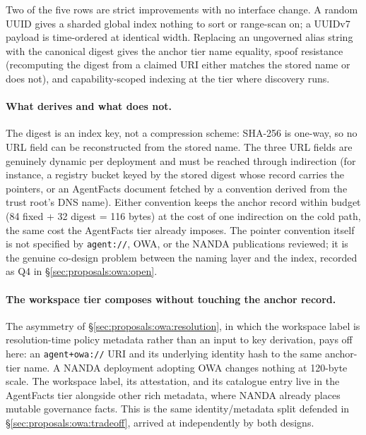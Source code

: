 Two of the five rows are strict improvements with no
interface change. A random UUID gives a sharded global
index nothing to sort or range-scan on; a UUIDv7 payload
is time-ordered at identical width. Replacing an
ungoverned alias string with the canonical digest gives
the anchor tier name equality, spoof resistance
(recomputing the digest from a claimed URI either matches
the stored name or does not), and capability-scoped
indexing at the tier where discovery runs.

\paragraph{What derives and what does not.}
The digest is an index key, not a compression scheme:
SHA-256 is one-way, so no URL field can be reconstructed
from the stored name. The three URL fields are genuinely
dynamic per deployment and must be reached through
indirection (for instance, a registry bucket keyed by the
stored digest whose record carries the pointers, or an
AgentFacts document fetched by a convention derived from
the trust root's DNS name). Either convention keeps the
anchor record within budget (84 fixed + 32 digest = 116
bytes) at the cost of one indirection on the cold path,
the same cost the AgentFacts tier already imposes. The
pointer convention itself is not specified by
\texttt{agent://}, OWA, or the NANDA publications
reviewed; it is the genuine co-design problem between the
naming layer and the index, recorded as Q4 in
\S\ref{sec:proposals:owa:open}.

\paragraph{The workspace tier composes without touching the anchor record.}
The asymmetry of \S\ref{sec:proposals:owa:resolution},
in which the workspace label is resolution-time policy
metadata rather than an input to key derivation, pays off
here: an \texttt{agent+owa://} URI and its underlying
identity hash to the same anchor-tier name. A NANDA
deployment adopting OWA changes nothing at 120-byte
scale. The workspace label, its attestation, and its
catalogue entry live in the AgentFacts tier alongside
other rich metadata, where NANDA already places mutable
governance facts. This is the same identity/metadata
split defended in \S\ref{sec:proposals:owa:tradeoff},
arrived at independently by both designs.

